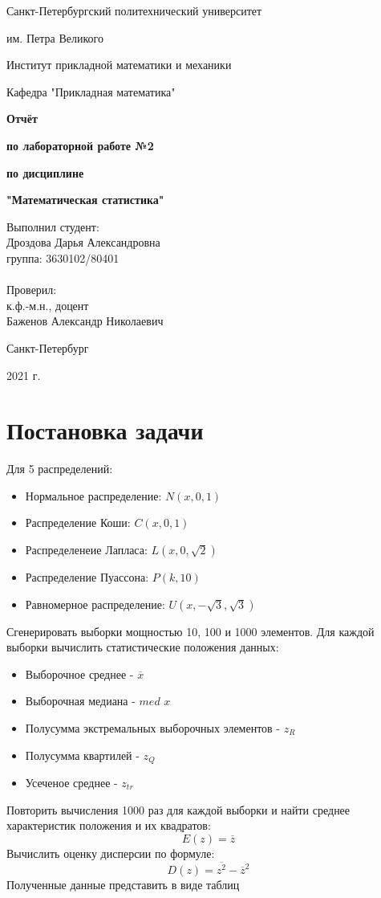 \documentclass{article}
\begin{document}
\begin{titlepage}
  \thispagestyle{empty}
  \centerline {Санкт-Петербургский политехнический университет}
  \centerline { им. Петра Великого}
  \centerline { }
  \centerline {Институт прикладной математики и механики} 
  \centerline {Кафедра "Прикладная математика"}
  \vfill
  \centerline{\textbf{Отчёт}}
  \centerline{\textbf{по лабораторной работе №2}}
  \centerline{\textbf{по дисциплине}}
  \centerline{\textbf{"Математическая статистика"}}
  \vfill
  \hfill
  \begin{minipage}{0.45\textwidth}
  Выполнил студент:\\
  Дроздова Дарья Александровна\\
  группа: 3630102/80401 \\
  \\
  Проверил:\\
  к.ф.-м.н., доцент \\
  Баженов Александр Николаевич
  \end{minipage}
  \vfill
  \centerline {Санкт-Петербург}   
  \centerline {2021 г.}  
\end{titlepage}

\newpage
\setcounter{page}{2}
\tableofcontents

\newpage
\listoftables

\newpage
\section{Постановка задачи}
  Для 5 распределений:
  \begin{itemize}
    \item Нормальное распределение: $N(x,0,1)$
    \item Распределение Коши: $C(x,0,1)$
    \item Распределенеие Лапласа: $L(x,0,\sqrt{2})$
    \item Распределение Пуассона: $P(k,10)$
    \item Равномерное распределение: $U(x,-\sqrt{3}, \sqrt{3})$
  \end{itemize}
  Сгенерировать выборки мощностью 10, 100 и 1000 элементов. Для каждой выборки вычислить статистические положения данных: 
  \begin{itemize}
    \item Выборочное среднее - $\overline{x}$
    \item Выборочная медиана - $med$ $x$
    \item Полусумма экстремальных выборочных элементов - $z_R$
    \item Полусумма квартилей - $z_Q$
    \item Усеченое среднее - $z_{tr}$
  \end{itemize}
  Повторить вычисления 1000 раз для каждой выборки и найти среднее характеристик положения и их квадратов:
  \begin{equation}
    E(z)=\overline{z}
    \label{eq: 1}
  \end{equation}
  Вычислить оценку дисперсии по формуле:
  \begin{equation}
    D(z)=\overline{z^2} - \overline{z}^2
    \label{eq: 2}
  \end{equation}
  Полученные данные представить в виде таблиц
  
\end{document}
